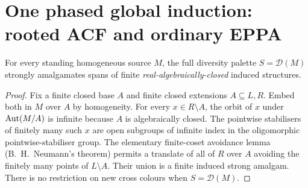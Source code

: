 
\section{One phased global induction: rooted ACF and ordinary EPPA}
\label{sec:global-phased-induction}

\begin{lemma}
\label{lem:acf-full-palette}
For every standing homogeneous source $M$, the full diversity
palette $S=\mathcal D(M)$ strongly amalgamates spans of finite
\emph{real-algebraically-closed} induced structures.
\end{lemma}
\begin{proof}
Fix a finite closed base $A$ and finite closed extensions
$A\subseteq L,R$.  Embed both in $M$ over $A$ by homogeneity.
For every $x\in R\setminus A$, the orbit of $x$ under
$\operatorname{Aut}(M/A)$ is infinite because $A$ is algebraically closed.
The pointwise stabilisers of finitely many such $x$ are
open subgroups of infinite index in the oligomorphic
pointwise-stabiliser group.  The elementary finite-coset
avoidance lemma (B.~H.~Neumann's theorem) permits a translate
of all of $R$ over $A$ avoiding the finitely many points
of $L\setminus A$.  Their union is a finite induced
strong amalgam.  There is no restriction on new cross
colours when $S=\mathcal D(M)$.
\end{proof}

